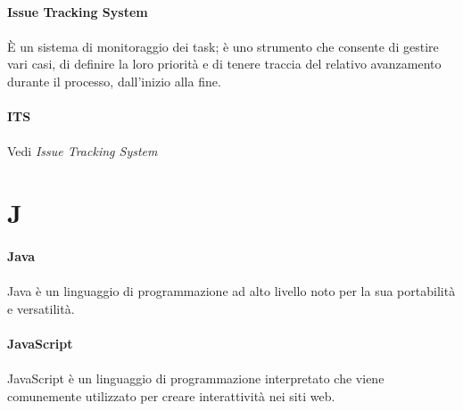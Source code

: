 \documentclass[10pt, a4paper]{article}
\begin{document}
\vspace{2em}
\paragraph{Issue Tracking System}\noindent\hrulefill
\paragraph{}È un sistema di monitoraggio dei task; è uno strumento che consente di gestire vari casi, di definire la loro priorità e di tenere traccia del relativo avanzamento durante il processo, dall'inizio alla fine. 

\vspace{2em}
\paragraph{ITS}\noindent\hrulefill
\paragraph{}Vedi \textit{Issue Tracking System\pg}

\newpage
\section{J}

\vspace{2em}
\paragraph{Java}\noindent\hrulefill
\paragraph{}Java è un linguaggio di programmazione ad alto livello noto per la sua portabilità e versatilità.

\vspace{2em}
\paragraph{JavaScript}\noindent\hrulefill
\paragraph{}JavaScript è un linguaggio di programmazione interpretato che viene comunemente utilizzato per creare interattività nei siti web.

\vspace{2em}
\end{document}

